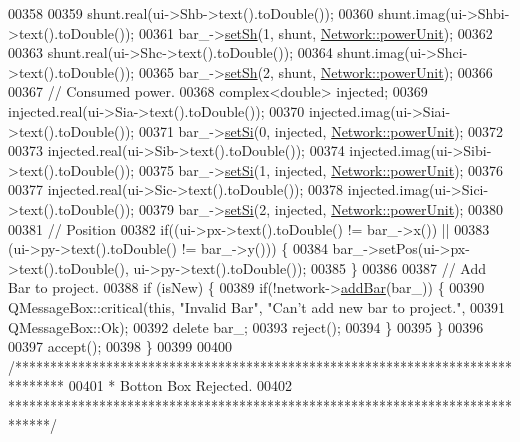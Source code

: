 \begin{DoxyCode}
00358 
00359   shunt.real(ui->Shb->text().toDouble());
00360   shunt.imag(ui->Shbi->text().toDouble());
00361   bar\_->\hyperlink{group___models_gafd91c7f15566b9d5a68a197efeaeaf26}{setSh}(1, shunt, \hyperlink{group___models_ga9504015bc566f4a3d3b4d4a86000293b}{Network::powerUnit});
00362 
00363   shunt.real(ui->Shc->text().toDouble());
00364   shunt.imag(ui->Shci->text().toDouble());
00365   bar\_->\hyperlink{group___models_gafd91c7f15566b9d5a68a197efeaeaf26}{setSh}(2, shunt, \hyperlink{group___models_ga9504015bc566f4a3d3b4d4a86000293b}{Network::powerUnit});
00366 
00367   \textcolor{comment}{// Consumed power.}
00368   complex<double> injected;
00369   injected.real(ui->Sia->text().toDouble());
00370   injected.imag(ui->Siai->text().toDouble());
00371   bar\_->\hyperlink{group___models_ga85e2a9b8a281900333fd65d1b532acfd}{setSi}(0, injected, \hyperlink{group___models_ga9504015bc566f4a3d3b4d4a86000293b}{Network::powerUnit});
00372 
00373   injected.real(ui->Sib->text().toDouble());
00374   injected.imag(ui->Sibi->text().toDouble());
00375   bar\_->\hyperlink{group___models_ga85e2a9b8a281900333fd65d1b532acfd}{setSi}(1, injected, \hyperlink{group___models_ga9504015bc566f4a3d3b4d4a86000293b}{Network::powerUnit});
00376 
00377   injected.real(ui->Sic->text().toDouble());
00378   injected.imag(ui->Sici->text().toDouble());
00379   bar\_->\hyperlink{group___models_ga85e2a9b8a281900333fd65d1b532acfd}{setSi}(2, injected, \hyperlink{group___models_ga9504015bc566f4a3d3b4d4a86000293b}{Network::powerUnit});
00380 
00381   \textcolor{comment}{// Position}
00382   \textcolor{keywordflow}{if}((ui->px->text().toDouble() != bar\_->x()) ||
00383       (ui->py->text().toDouble() != bar\_->y())) \{
00384     bar\_->setPos(ui->px->text().toDouble(), ui->py->text().toDouble());
00385   \}
00386 
00387   \textcolor{comment}{// Add Bar to project.}
00388   \textcolor{keywordflow}{if} (isNew) \{
00389     \textcolor{keywordflow}{if}(!network->\hyperlink{group___models_ga8c5dfef0216731246f7411e1a5fbee01}{addBar}(bar\_)) \{
00390       QMessageBox::critical(\textcolor{keyword}{this}, \textcolor{stringliteral}{"Invalid Bar"}, \textcolor{stringliteral}{"Can't add new bar to project."},
00391                             QMessageBox::Ok);
00392       \textcolor{keyword}{delete} bar\_;
00393       reject();
00394     \}
00395   \}
00396 
00397   accept();
00398 \}
00399 
00400 \textcolor{comment}{/*******************************************************************************}
00401 \textcolor{comment}{ * Botton Box Rejected.}
00402 \textcolor{comment}{ ******************************************************************************/}

\end{DoxyCode}
